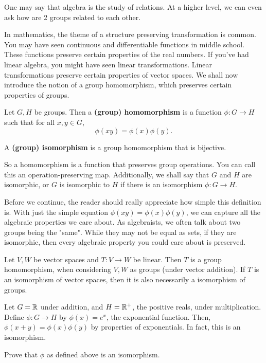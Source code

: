 \documentclass[./algebra-notes.tex]{subfiles}
\begin{document}
One may say that algebra is the study of relations. At a higher level, we can
even ask how are 2 groups related to each other. 

In mathematics, the theme of a structure preserving transformation is common.
You may have seen continuous and differentiable functions in middle school.
These functions preserve certain properties of the real numbers. If you've had
linear algebra, you might have seen linear transformations. Linear
transformations preserve certain properties of vector spaces. We shall now
introduce the notion of a group homomorphism, which preserves certain properties
of groups.
\begin{definition}
\label{def:group-homomorphism}
Let $G, H$ be groups. Then a \textbf{(group) homomorphism} is a function $\phi:
G \to H$ such that for all $x, y \in G$,
\[
    \phi(xy) = \phi(x)\phi(y).
\]  

A \textbf{(group) isomorphism} is a group homomorphism that is bijective. 
\end{definition}
So a homomorphism is a function that preserves group operations. You can call
this an operation-preserving map. Additionally, we shall say that $G$ and $H$
are isomorphic, or $G$ is isomorphic to $H$ if there is an isomorphism $\phi: G
\to H$.

Before we continue, the reader should really appreciate how simple this
definition is. With just the simple equation $\phi(xy) = \phi(x)\phi(y)$, we can
capture all the algebraic properties we care about. As algebraists, we often
talk about two groups being the "same". While they may not be equal as sets, if
they are isomorphic, then every algebraic property you could care about is
preserved.

\begin{example}
    Let $V, W$ be vector spaces and $T: V \to W$ be linear. Then $T$ is a group
    homomorphism, when considering $V, W$ as groups (under vector addition). If
    $T$ is an isomorphism of vector spaces, then it is also necessarily a
    isomorphism of groups.
\end{example}

\begin{example}[Exponential]
    Let $G = \mathbb{R}$ under addition, and $H = \mathbb{R}^+$, the positive reals, under
    multiplication. Define $\phi: G \to H$ by $\phi(x) = e^x$, the exponential
    function. Then, $\phi(x+y) = \phi(x) \phi(y)$ by properties of exponentials.
    In fact, this is an isomorphism.
\end{example}
\begin{exercise}
    Prove that $\phi$ as defined above is an isomorphism.
\end{exercise}
\end{document}
